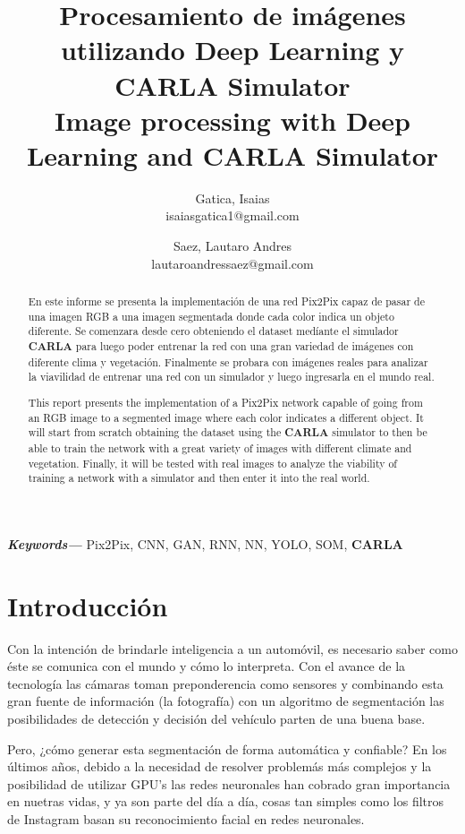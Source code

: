 \documentclass[]{IEEEtran}
\title{Procesamiento de imágenes utilizando Deep Learning y CARLA 
Simulator \\ 
Image processing with Deep Learning and CARLA Simulator}
\author{ 
Gatica, Isaias \\ { \small{isaiasgatica1@gmail.com} }\\ \and 
Saez, Lautaro Andres { \\ \small{lautaroandressaez@gmail.com } } }
\date{}
\providecommand{\keywords}[1]
{
  \small	
  \textbf{\textit{Keywords---}} #1
}
\begin{document}
    \maketitle

    \begin{abstract}
        En este informe se presenta la implementación de una red Pix2Pix capaz de pasar de una imagen RGB a 
        una imagen segmentada donde cada color indica un objeto diferente. Se comenzara desde cero obteniendo el 
        dataset medíante el simulador \textbf{CARLA} para luego poder entrenar la red con una gran variedad de imágenes con 
        diferente clima y vegetación. Finalmente se probara con imágenes reales para analizar la viavilidad de entrenar una 
        red con un simulador y luego ingresarla en el mundo real.
    \end{abstract}


    \begin{abstract}
        This report presents the implementation of a Pix2Pix network capable of going from an RGB image to
        a segmented image where each color indicates a different object. It will start from scratch obtaining the
        dataset using the \textbf{CARLA} simulator to then be able to train the network with a great variety of images with
        different climate and vegetation. Finally, it will be tested with real images to analyze the viability of training a
        network with a simulator and then enter it into the real world.
    \end{abstract}

    \keywords{Pix2Pix, CNN, GAN, RNN, NN, YOLO, SOM, \textbf{CARLA}}


    \section{Introducción}

    Con la intención de brindarle inteligencia a un automóvil, es necesario saber como éste se comunica con el mundo y cómo lo interpreta.
    Con el avance de la tecnología las cámaras toman preponderencia como sensores y combinando esta gran fuente de información (la fotografía) con un 
    algoritmo de segmentación las posibilidades de detección y decisión del vehículo parten de una buena base. 

    Pero, ¿cómo generar esta segmentación de forma automática y confiable? En los últimos años, debido a la necesidad de resolver problemás más complejos y la posibilidad de utilizar GPU's las redes neuronales han cobrado 
    gran importancia en nuetras vidas, y ya son parte del día a día, cosas tan simples como los filtros de Instagram basan 
    su reconocimiento facial en redes neuronales. 
\end{document}
